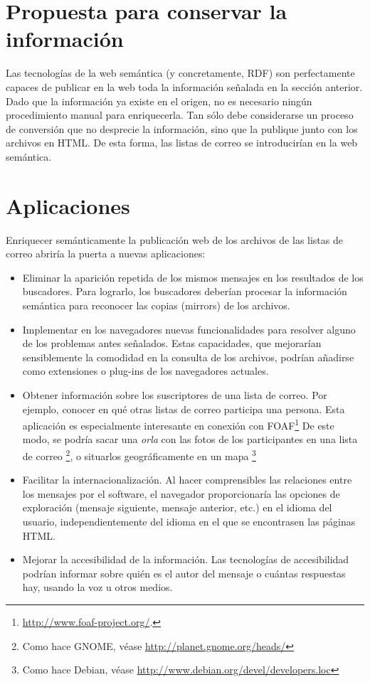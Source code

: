 \section*{Propuesta para conservar la información}

Las tecnologías de la web semántica (y concretamente, RDF) son perfectamente
capaces de publicar en la web toda la información señalada en la sección
anterior. Dado que la información ya existe en el origen, no es necesario 
ningún procedimiento manual para enriquecerla. Tan sólo debe considerarse un 
proceso de conversión que no desprecie la información, sino que la publique 
junto con los archivos en HTML. De esta forma, las listas de correo se 
introducirían en la web semántica.

\section*{Aplicaciones}

Enriquecer semánticamente la publicación web de los archivos de las listas
de correo abriría la puerta a nuevas aplicaciones:

\begin{itemize}
  \item Eliminar la aparición repetida de los mismos mensajes en los resultados
 	de los buscadores. Para lograrlo, los buscadores deberían procesar la 
	información semántica para reconocer las copias (mirrors) de los archivos.
  \item Implementar en los navegadores nuevas funcionalidades para resolver alguno
	de los problemas antes señalados. Estas capacidades, que mejorarían 
	sensiblemente la comodidad en la consulta de los archivos, podrían añadirse 
	como extensiones o plug-ins de los navegadores actuales.
  \item Obtener información sobre los suscriptores de una lista de correo. Por 
	ejemplo, conocer en qué otras listas de correo participa una persona. 
	Esta aplicación es especialmente interesante en conexión con 
	FOAF\footnote{\url{http://www.foaf-project.org/}.} De este modo, se 
	podría sacar una \emph{orla} con las fotos de los participantes en una 
	lista de correo \footnote{Como hace GNOME, véase 
	\url{http://planet.gnome.org/heads/}}, o situarlos geográficamente en un 
	mapa \footnote{Como hace Debian, 
	véase \url{http://www.debian.org/devel/developers.loc}}
  \item Facilitar la internacionalización. Al hacer comprensibles las relaciones entre 
	los mensajes por el software, el navegador proporcionaría las opciones de 
	exploración (mensaje siguiente, mensaje anterior, etc.) en el idioma del 
	usuario, independientemente del idioma en el que se encontrasen las páginas 
	HTML.
  \item Mejorar la accesibilidad de la información. Las tecnologías de accesibilidad 
	podrían informar sobre quién es el autor del mensaje o cuántas respuestas hay, 
	usando la voz u otros medios.
\end{itemize}

